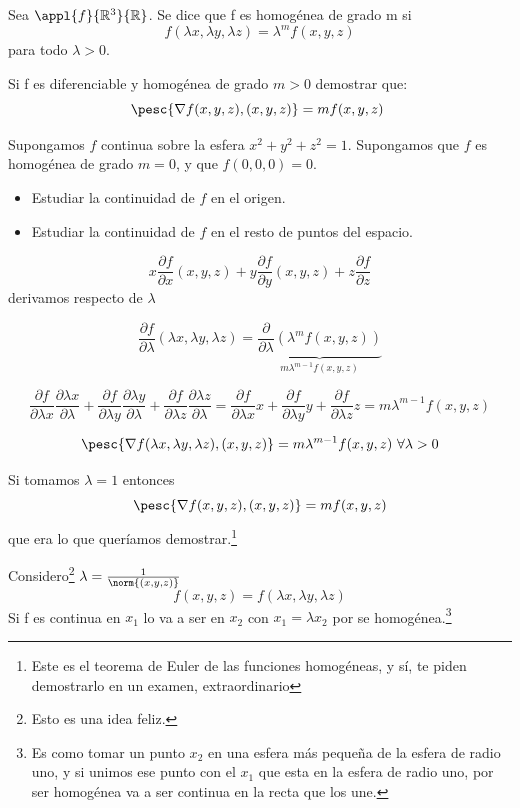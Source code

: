 \begin{problem}[1]
 Sea $\appl{f}{\mathbb{R}^3}{\mathbb{R}}$. Se dice que f es homogénea de grado m si 
\[ f(\lambda x, \lambda y, \lambda z) = \lambda ^m f(x,y,z) \] para todo $\lambda > 0$.

\ppart  Si f es diferenciable y homogénea de grado $m>0$ demostrar que:
\[ \pesc{\nabla f(x,y,z), (x,y,z)} = mf(x,y,z) \]

\ppart Supongamos $f$ continua sobre la esfera ${x^2+y^2+z^2=1}$. Supongamos que $f$ es homogénea de grado $m = 0$, y que $f(0,0,0) = 0$.

\begin{itemize}
\item Estudiar la continuidad de $f$ en el origen.
\item Estudiar la continuidad de $f$ en el resto de puntos del espacio.
\end{itemize}

\solution

\spart \[ x\frac{\partial  f}{\partial  x}(x,y,z) + y\frac{\partial  f}{\partial  y}(x,y,z) + z\frac{\partial  f}{\partial  z}\]
derivamos respecto de $\lambda$

$$\frac{\partial  f}{\partial  \lambda}(\lambda x, \lambda y, \lambda z) = \underbrace{\frac{\partial }{\partial  \lambda}(\lambda^mf(x,y,z))}_{m\lambda^{m-1}f(x,y,z)}$$

$$\frac{\partial  f}{\partial  \lambda x}\frac{\partial  \lambda x}{\partial  \lambda} + \frac{\partial  f}{\partial  \lambda y}\frac{\partial  \lambda y}{\partial  \lambda} + \frac{\partial  f}{\partial  \lambda z}\frac{\partial  \lambda z}{\partial  \lambda} = \frac{\partial  f}{\partial  \lambda x}x + \frac{\partial  f}{\partial  \lambda y}y + \frac{\partial  f}{\partial  \lambda z}z = m\lambda ^{m-1} f(x,y,z) $$

$$\pesc{\nabla f(\lambda x,\lambda y,\lambda z), (x,y,z)} = m\lambda^{m-1} f(x,y,z)\ \forall \lambda > 0$$

Si tomamos $\lambda = 1$ entonces $$\pesc{\nabla f(x,y,z), (x,y,z)} = mf(x,y,z)$$ que era lo que queríamos demostrar.\footnote{Este es el teorema de Euler de las funciones homogéneas, y sí, te piden demostrarlo en un examen, extraordinario}


\spart 
Considero\footnote{Esto es una idea feliz.} $\lambda = \frac{1}{\norm{(x,y,z)}}$\\
\[ f(x,y,z) = f(\lambda x, \lambda y, \lambda z) \]
Si f es continua en $x_1$ lo va a ser en $x_2$ con $x_1 = \lambda x_2$ por se homogénea.\footnote{Es como tomar un punto $x_2$ en una esfera más pequeña de la esfera de radio uno, y si unimos ese punto con el $x_1$ que esta en la esfera de radio uno, por ser homogénea va a ser continua en la recta que los une.}


\end{problem}

